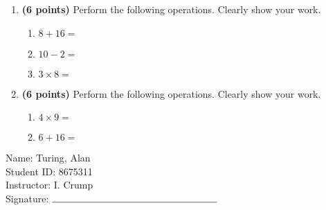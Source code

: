 \documentclass[12pt]{amsart}
\begin{document}
\newpage
\begin{enumerate}
\item {\bf (6 points)} 
 Perform the following operations. Clearly show your work. \begin{enumerate}


\def \a{8}\def \b{16}\def \apb{24}

 
\item $\a + \b = $

\vspace{2cm}
\def \a{10}\def \dif{8}\def \b{2}

 
\item $\a - \b = $

\vspace{2cm}
\def \a{3}\def \b{8}\def \ab{11}

 
\item $\a \times \b = $ 

\vspace{2cm}
\def \vshift{1}\def \hshift{-2}\def \chang{2}\def \findval{0}\def \yval{-3}

 
\end{enumerate}


\newpage
\item {\bf (6 points)} 
 Perform the following operations. Clearly show your work. \begin{enumerate}


\def \a{4}\def \b{9}\def \ab{13}

 
\item $\a \times \b = $ 

\vspace{2cm}
\def \a{6}\def \b{16}\def \apb{22}

 
\item $\a + \b = $

\vspace{2cm}
\def \vshift{-3}\def \hshift{-4}\def \chang{-2}\def \findval{-6}\def \yval{1}

 
\end{enumerate}


\newpage\end{enumerate}\graphicspath{{/Users/jilan/Downloads/Randomizer/Randomizer/Sample Course/Sample Assessment 2/}}\setcounter{page}{1}


\thispagestyle{fancy}

 \noindent Name: Turing, Alan \vspace{.3cm} \\\noindent Student ID: 8675311 \vspace{.3cm} \\\noindent Instructor: I. Crump \vspace{.3cm} \\\noindent Signature: $\rule{6cm}{0.15mm}$ \vspace{.3cm} \\ 
\end{document}
